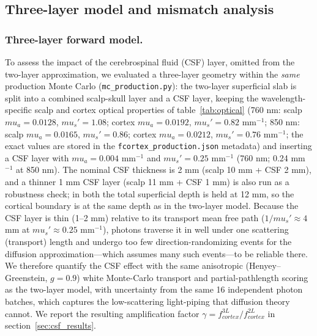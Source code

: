 \documentclass[11pt]{article}
\def\mu{mu}%
\def\mathrm#1{#1}%
\def\,{ }%
\begin{document}
\subsection{Three-layer model and mismatch analysis}
\label{sec:mismatch}

\subsubsection{Three-layer forward model.}
To assess the impact of the cerebrospinal fluid (CSF) layer, omitted from the two-layer approximation, we evaluated a three-layer geometry within the \emph{same} production Monte Carlo (\texttt{mc\_production.py}): the two-layer superficial slab is split into a combined scalp-skull layer and a CSF layer, keeping the wavelength-specific scalp and cortex optical properties of table~\ref{tab:optical} (760\,nm: scalp $\mu_a{=}0.0128$, $\mu_s'{=}1.08$; cortex $\mu_a{=}0.0192$, $\mu_s'{=}0.82$\,mm$^{-1}$; 850\,nm: scalp $\mu_a{=}0.0165$, $\mu_s'{=}0.86$; cortex $\mu_a{=}0.0212$, $\mu_s'{=}0.76$\,mm$^{-1}$; the exact values are stored in the \texttt{fcortex\_production.json} metadata) and inserting a CSF layer with $\mu_a = 0.004$\,mm$^{-1}$ and $\mu_s' = 0.25$\,mm$^{-1}$ (760\,nm; 0.24\,mm$^{-1}$ at 850\,nm). The nominal CSF thickness is 2\,mm (scalp 10\,mm + CSF 2\,mm), and a thinner 1\,mm CSF layer (scalp 11\,mm + CSF 1\,mm) is also run as a robustness check; in both the total superficial depth is held at 12\,mm, so the cortical boundary is at the same depth as in the two-layer model. Because the CSF layer is thin (1--2\,mm) relative to its transport mean free path ($1/\mu_s' \approx 4$\,mm at $\mu_s' \approx 0.25$\,mm$^{-1}$), photons traverse it in well under one scattering (transport) length and undergo too few direction-randomizing events for the diffusion approximation---which assumes many such events---to be reliable there. We therefore quantify the CSF effect with the same anisotropic (Henyey--Greenstein, $g=0.9$) white Monte-Carlo transport and partial-pathlength scoring as the two-layer model, with uncertainty from the same 16 independent photon batches, which captures the low-scattering light-piping that diffusion theory cannot\cite{r12}. We report the resulting amplification factor $\gamma = f_{\mathrm{cortex}}^{\mathrm{3L}}/f_{\mathrm{cortex}}^{\mathrm{2L}}$ in section~\ref{sec:csf_results}.
\end{document}
